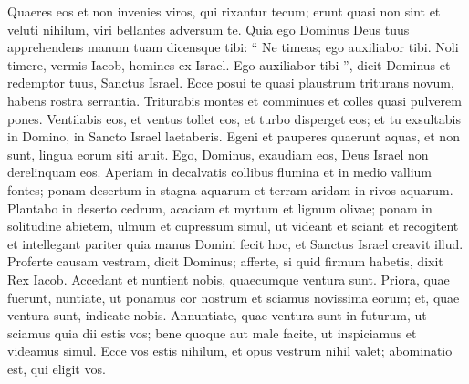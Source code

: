 \begin{biblechapter}
\begin{biblechapter}
\begin{biblechapter}
\begin{biblechapter}
\begin{biblechapter}
\begin{biblechapter}
\begin{biblechapter}
\begin{biblechapter}
\begin{biblechapter}
\begin{biblechapter}
\begin{biblechapter}
\begin{biblechapter}
\begin{biblechapter}
\begin{biblechapter}
\begin{biblechapter}
\begin{biblechapter}
\begin{biblechapter}
\begin{biblechapter}
\begin{biblechapter}
\begin{biblechapter}
\begin{biblechapter}
\begin{biblechapter}
\begin{biblechapter}
\begin{biblechapter}
\begin{biblechapter}
\begin{biblechapter}
\begin{biblechapter}
\begin{biblechapter}
\begin{biblechapter}
\begin{biblechapter}
\begin{biblechapter}
\begin{biblechapter}
\begin{biblechapter}
\begin{biblechapter}
\begin{biblechapter}
\begin{biblechapter}
\begin{biblechapter}
\begin{biblechapter}
\begin{biblechapter}
\begin{biblechapter}
\begin{biblechapter}
 \verse Quaeres eos et non invenies
 viros, qui rixantur tecum;
 erunt quasi non sint et veluti nihilum,
 viri bellantes adversum te.
 \verse Quia ego Dominus Deus tuus
 apprehendens manum tuam
 dicensque tibi: “ Ne timeas;
 ego auxiliabor tibi.
 \verse Noli timere, vermis Iacob,
 homines ex Israel.
 Ego auxiliabor tibi ”, dicit Dominus
 et redemptor tuus, Sanctus Israel.
 \verse Ecce posui te quasi plaustrum triturans novum,
 habens rostra serrantia.
 Triturabis montes et comminues
 et colles quasi pulverem pones.
 \verse Ventilabis eos, et ventus tollet eos,
 et turbo disperget eos;
 et tu exsultabis in Domino,
 in Sancto Israel laetaberis.
 \verse Egeni et pauperes quaerunt aquas, et non sunt,
 lingua eorum siti aruit.
 Ego, Dominus, exaudiam eos,
 Deus Israel non derelinquam eos.
 \verse Aperiam in decalvatis collibus flumina
 et in medio vallium fontes;
 ponam desertum in stagna aquarum
 et terram aridam in rivos aquarum.
 \verse Plantabo in deserto cedrum,
 acaciam et myrtum et lignum olivae;
 ponam in solitudine abietem,
 ulmum et cupressum simul,
 \verse ut videant et sciant
 et recogitent et intellegant pariter
 quia manus Domini fecit hoc,
 et Sanctus Israel creavit illud.
 \verse Proferte causam vestram, dicit Dominus;
 afferte, si quid firmum habetis, dixit Rex Iacob.
 \verse Accedant et nuntient nobis, quaecumque ventura sunt.
 Priora, quae fuerunt, nuntiate,
 ut ponamus cor nostrum et sciamus novissima eorum;
 et, quae ventura sunt, indicate nobis.
 \verse Annuntiate, quae ventura sunt in futurum,
 ut sciamus quia dii estis vos;
 bene quoque aut male facite,
 ut inspiciamus et videamus simul.
 \verse Ecce vos estis nihilum,
 et opus vestrum nihil valet;
 abominatio est, qui eligit vos.

\end{biblechapter}
\end{biblechapter}
\end{biblechapter}
\end{biblechapter}
\end{biblechapter}
\end{biblechapter}
\end{biblechapter}
\end{biblechapter}
\end{biblechapter}
\end{biblechapter}
\end{biblechapter}
\end{biblechapter}
\end{biblechapter}
\end{biblechapter}
\end{biblechapter}
\end{biblechapter}
\end{biblechapter}
\end{biblechapter}
\end{biblechapter}
\end{biblechapter}
\end{biblechapter}
\end{biblechapter}
\end{biblechapter}
\end{biblechapter}
\end{biblechapter}
\end{biblechapter}
\end{biblechapter}
\end{biblechapter}
\end{biblechapter}
\end{biblechapter}
\end{biblechapter}
\end{biblechapter}
\end{biblechapter}
\end{biblechapter}
\end{biblechapter}
\end{biblechapter}
\end{biblechapter}
\end{biblechapter}
\end{biblechapter}
\end{biblechapter}
\end{biblechapter}
